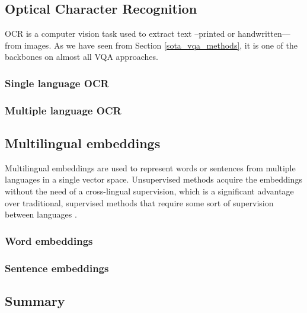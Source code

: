 \subsection{Optical Character Recognition}
\label{sota_ocr}

OCR is a computer vision task used to extract text –printed or handwritten–– from images. As we have seen from Section \ref{sota_vqa_methods}, it is one of the backbones on almost all VQA approaches.

\cite{wang2010word, mishra:hal-00818183}

\subsubsection{Single language OCR}
\label{sota_ocr_single_language}

\cite{}

\subsubsection{Multiple language OCR}
\label{sota_ocr_multiple_language}

\cite{borisyuk2018rosetta}

\subsection{Multilingual embeddings}
\label{sota_embeddings}
Multilingual embeddings are used to represent words or sentences from multiple languages in a single vector space.  Unsupervised methods acquire the embeddings without the need of a cross-lingual supervision, which is a significant advantage over traditional, supervised methods that require some sort of supervision between languages \cite{chen2018unsupervised}.

\cite{TIEDEMANN12.463,mikolov2013exploiting, ferreira2016jointly,DBLP:journals/corr/abs-1810-04805}

\subsubsection{Word embeddings}
\label{sota_word_embeddings}

\cite{klementiev2012inducing, faruqui2014improving,hermann2014multilingual,lauly2014autoencoder, gouws2015bilbowa,levy2015improving, gouws2015bilbowa,luong2015bilingual, joulin2016bag,DBLP:journals/corr/SmithTHH17,conneau2017word,speer2017conceptnet,bojanowski2017enriching,chen2018unsupervised,heinzerling2018bpemb, jawanpuria2019learning}

\subsubsection{Sentence embeddings}
\label{sota_sentence_embeddings}

\cite{le2014distributed, 10.1162/tacl_a_00288}


\subsection{Summary}
\label{sota_summary}


